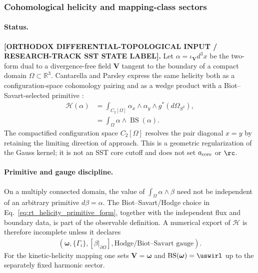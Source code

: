 \subsubsection{Cohomological helicity and mapping-class sectors}
\label{subsubsec:rt_helicity_mapping_class}
\paragraph{Status.}
\textbf{[ORTHODOX DIFFERENTIAL-TOPOLOGICAL INPUT / RESEARCH-TRACK SST STATE LABEL].}
Let $\alpha=\iota_{\mathbf V}d^3x$ be the two-form dual to a divergence-free
field $\mathbf V$ tangent to the boundary of a compact domain
$\Omega\subset\mathbb R^3$.  Cantarella and Parsley express the same helicity
both as a configuration-space cohomology pairing and as a wedge product with a
Biot--Savart-selected primitive \cite{CantarellaParsley2010Helicity}:
\begin{align}
    \mathcal H(\alpha)
    &=
    \int_{C_2[\Omega]}
    \alpha_x\wedge\alpha_y\wedge g^*(d\Omega_{S^2}),
    \label{eq:rt_helicity_configuration_space}\\
    &=
    \int_{\Omega}\alpha\wedge\operatorname{BS}(\alpha).
    \label{eq:rt_helicity_primitive_form}
\end{align}
The compactified configuration space $C_2[\Omega]$ resolves the pair diagonal
$x=y$ by retaining the limiting direction of approach.  This is a geometric
regularization of the Gauss kernel; it is not an SST core cutoff and does not
set $a_{\rm core}$ or $\rc$.

\paragraph{Primitive and gauge discipline.}
On a multiply connected domain, the value of
$\int_{\Omega}\alpha\wedge\beta$ need not be independent of an arbitrary
primitive $d\beta=\alpha$.  The Biot--Savart/Hodge choice in
Eq.~\eqref{eq:rt_helicity_primitive_form}, together with the independent flux
and boundary data, is part of the observable definition.  A numerical export
of $\mathcal H$ is therefore incomplete unless it declares
\begin{align}
    \left(
        \boldsymbol\omega,
        \{\Gamma_i\},
        [\beta|_{\partial\Omega}],
        \text{Hodge/Biot--Savart gauge}
    \right).
    \label{eq:rt_helicity_gauge_metadata}
\end{align}
For the kinetic-helicity mapping one sets $\mathbf V=\boldsymbol\omega$ and
$\operatorname{BS}(\boldsymbol\omega)=\uswirl$ up to the separately fixed
harmonic sector.


